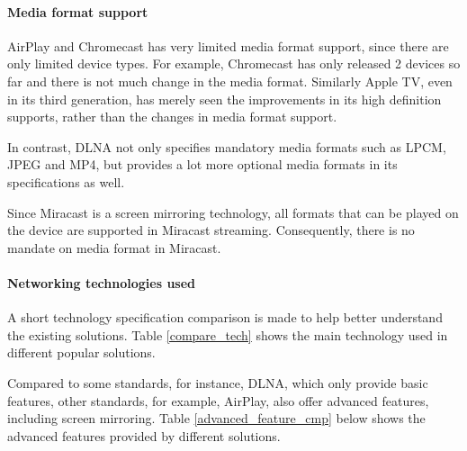 \paragraph{Media format support\label{2_3_3_1}} 
AirPlay and Chromecast has very limited media format support, since there are 
only limited device types. For example, Chromecast has only released 2 devices so far and there is not much change in the media format. Similarly Apple TV, even in its third generation,  has merely seen the improvements in its high definition supports, rather than the changes in media format support.

In contrast, DLNA not only specifies mandatory media formats such as LPCM, JPEG  and MP4, but provides a lot more optional media formats in its specifications as well.

Since Miracast is a screen mirroring technology, all formats that can be played on the device are supported in Miracast streaming. Consequently, there is no mandate on media format in Miracast.  
\paragraph{Networking technologies used\label{2_3_3_2}}
A short technology specification comparison is made to help better understand
the existing solutions. Table \ref{compare_tech} shows the main technology used 
in different popular solutions.

\begin{table}[htb] 
\caption{Comparison of used technologies\label{compare_tech}} 
\begin{center} 
\end{center} 
\end{table} 

Compared to some standards, for instance, DLNA, which only provide basic features, other standards, for example, AirPlay, also offer advanced 
features, including screen mirroring. Table \ref{advanced_feature_cmp} below
shows the advanced features provided by different solutions.

